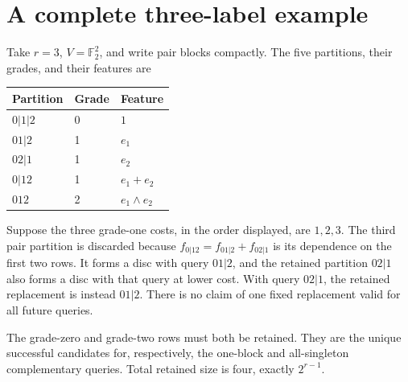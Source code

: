 \documentclass[11pt,a4paper]{article}
\theoremstyle{remark}\newtheorem{remark}[theorem]{Remark}
\newcommand{\F}{\mathbb F_2}
\begin{document}
\appendix
\section{A complete three-label example}\label{app:example}
Take $r=3$, $V=\F^2$, and write pair blocks compactly. The five partitions, their grades, and their features are
\begin{center}
\begin{tabular}{lll}
\toprule
Partition & Grade & Feature\\
\midrule
$0|1|2$ & 0 & $1$\\
$01|2$ & 1 & $e_1$\\
$02|1$ & 1 & $e_2$\\
$0|12$ & 1 & $e_1+e_2$\\
$012$ & 2 & $e_1\wedge e_2$\\
\bottomrule
\end{tabular}
\end{center}
Suppose the three grade-one costs, in the order displayed, are $1,2,3$. The third pair partition is discarded because $f_{0|12}=f_{01|2}+f_{02|1}$ is its dependence on the first two rows. It forms a disc with query $01|2$, and the retained partition $02|1$ also forms a disc with that query at lower cost. With query $02|1$, the retained replacement is instead $01|2$. There is no claim of one fixed replacement valid for all future queries.

The grade-zero and grade-two rows must both be retained. They are the unique successful candidates for, respectively, the one-block and all-singleton complementary queries. Total retained size is four, exactly $2^{r-1}$.
\end{document}
